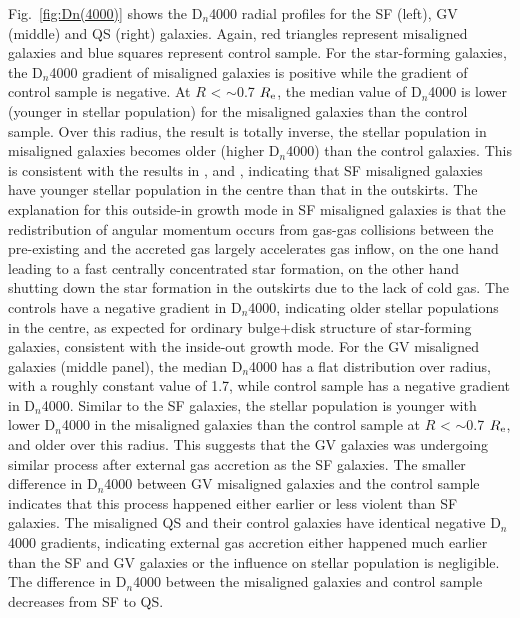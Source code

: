 Fig.~\ref{fig:Dn(4000)} shows the D$_n$4000 radial profiles for the SF (left), GV (middle) and QS (right) galaxies. Again, red triangles represent misaligned galaxies and blue squares represent control sample. For the star-forming galaxies, the D$_n$4000 gradient of misaligned galaxies is positive while the gradient of control sample is negative. At $R$ < $\sim$0.7 $R_{\rm e}$, the median value of D$_n$4000 is lower (younger in stellar population) for the misaligned galaxies than the control sample. Over this radius, the result is totally inverse, the stellar population in misaligned galaxies becomes older (higher D$_n$4000) than the control galaxies. This is consistent with the results in \citet{chen_growth_2016}, \citet{jin_sdss-iv_2016} and \citet{bizyaev_sdss_2019}, indicating that SF misaligned galaxies have younger stellar population in the centre than that in the outskirts. The explanation for this outside-in growth mode in SF misaligned galaxies is that the redistribution of angular momentum occurs from gas-gas collisions between the pre-existing and the accreted gas largely accelerates gas inflow, on the one hand leading to a fast centrally concentrated star formation, on the other hand shutting down the star formation in the outskirts due to the lack of cold gas. The controls have a negative gradient in D$_n$4000, indicating older stellar populations in the centre, as expected for ordinary bulge+disk structure of star-forming galaxies, consistent with the inside-out growth mode. For the GV misaligned galaxies (middle panel), the median D$_n$4000 has a flat distribution over radius, with a roughly constant value of 1.7, while control sample has a negative gradient in D$_n$4000. Similar to the SF galaxies, the stellar population is younger with lower D$_n$4000 in the misaligned galaxies than the control sample at $R$ < $\sim$0.7 $R_{\rm e}$, and older over this radius. This suggests that the GV galaxies was undergoing similar process after external gas accretion as the SF galaxies. The smaller difference in D$_n$4000 between GV misaligned galaxies and the control sample indicates that this process happened either earlier or less violent than SF galaxies. The misaligned QS and their control galaxies have identical negative D$_n$4000 gradients, indicating external gas accretion either happened much earlier than the SF and GV galaxies or the influence on stellar population is negligible. The difference in D$_n$4000 between the misaligned galaxies and control sample decreases from SF to QS.

